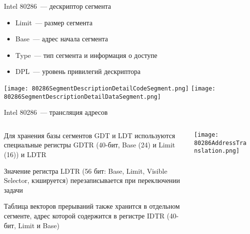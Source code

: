 \documentclass[aspectratio=169,14pt]{beamer}
\begin{document}
\begin{frame}{Intel 80286~--- дескриптор сегмента}
    \begin{itemize}
        \item Limit~--- размер сегмента
        \item Base~--- адрес начала сегмента
        \item Type~--- тип сегмента и информация о доступе
        \item DPL~--- уровень привилегий дескриптора
    \end{itemize}

    \texttt{[image: 80286SegmentDescriptionDetailCodeSegment.png]}
    \texttt{[image: 80286SegmentDescriptionDetailDataSegment.png]}
\end{frame}

\begin{frame}{Intel 80286~--- трансляция адресов}
    \begin{columns}[T,onlytextwidth]
        \begin{column}[c]{0.5\textwidth}
            \begin{itemize}
                \begin{footnotesize}
                    \item Для хранения базы сегментов GDT и LDT используются
                    специальные регистры GDTR (40-бит, Base (24) и Limit (16)) и LDTR
                    \item Значение регистра LDTR (56 бит: Base, Limit, Visible Selector,
                    кэшируется) перезаписывается при переключении задачи
                    \item Таблица векторов прерываний также хранится в отдельном
                    сегменте, адрес которой содержится в регистре IDTR
                    (40-бит, Limit и Base)
                    \end{footnotesize}
            \end{itemize}
        \end{column}
        \begin{column}[c]{0.5\textwidth}
            \texttt{[image: 80286AddressTranslation.png]}
        \end{column}
    \end{columns}
\end{frame}
\end{document}
